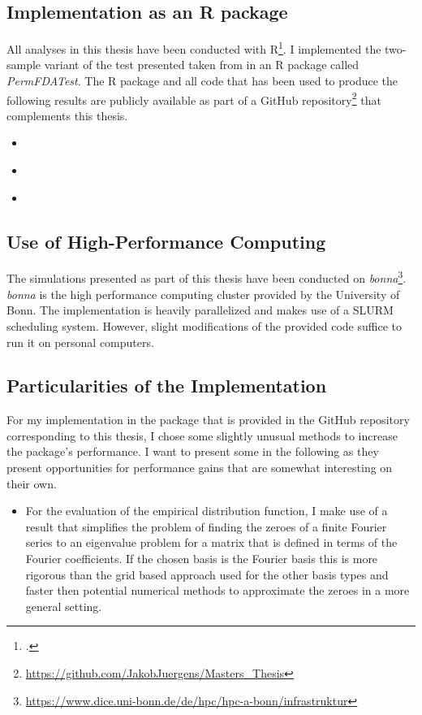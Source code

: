 \documentclass[12pt, a4paper]{article}
\theoremstyle{MAstyle} \newtheorem{assumption}{Assumption}[section]
\theoremstyle{MAstyle} \newtheorem{definition}{Definition}[section]
\theoremstyle{MAstyle} \newtheorem{theorem}{Theorem}[section]
\begin{document}
		\subsection{Implementation as an R package}
			All analyses in this thesis have been conducted with R\footcite{R}. I implemented the two-sample variant of the test presented taken from \cite{bugni_permutation_2021} in an R package called \textit{PermFDATest}. The R package and all code that has been used to produce the following results are publicly available as part of a GitHub repository\footnote{\href{https://github.com/JakobJuergens/Masters_Thesis}{https://github.com/JakobJuergens/Masters\_Thesis}} that complements this thesis.
			
			\begin{itemize}
				\item \cite{fda}
				\item \cite{tidyverse}
				\item \cite{refund}
			\end{itemize}
			
		\subsection{Use of High-Performance Computing}
			The simulations presented as part of this thesis have been conducted on \textit{bonna}\footnote{\href{https://www.dice.uni-bonn.de/de/hpc/hpc-a-bonn/infrastruktur}{https://www.dice.uni-bonn.de/de/hpc/hpc-a-bonn/infrastruktur}}. \textit{bonna} is the high performance computing cluster provided by the University of Bonn. The implementation is heavily parallelized and makes use of a SLURM scheduling system. However, slight modifications of the provided code suffice to run it on personal computers.

		\subsection{Particularities of the Implementation}
			For my implementation in the package that is provided in the GitHub repository corresponding to this thesis, I chose some slightly unusual methods to increase the package's performance. I want to present some in the following as they present opportunities for performance gains that are somewhat interesting on their own.
			\begin{itemize}
				\item For the evaluation of the empirical distribution function, I make use of a result \cite{boyd_computing_2006} that simplifies the problem of finding the zeroes of a finite Fourier series to an eigenvalue problem for a matrix that is defined in terms of the Fourier coefficients. If the chosen basis is the Fourier basis this is more rigorous than the grid based approach used for the other basis types and faster then potential numerical methods to approximate the zeroes in a more general setting.
			\end{itemize}
\end{document}

